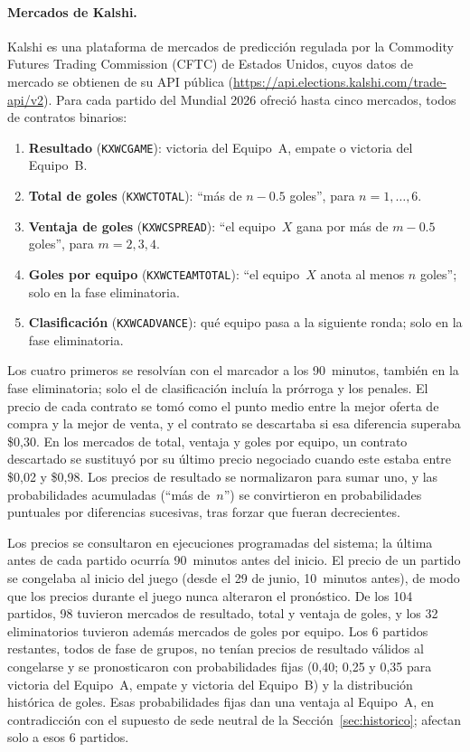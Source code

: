 \documentclass[12pt]{article}
\theoremstyle{plain}
\theoremstyle{remark}
\begin{document}
\paragraph{Mercados de Kalshi.}
Kalshi es una plataforma de mercados de predicción regulada por la
Commodity Futures Trading Commission (CFTC) de Estados Unidos, cuyos
datos de mercado se obtienen de su API pública
(\url{https://api.elections.kalshi.com/trade-api/v2}).
Para cada partido del Mundial 2026 ofreció hasta cinco mercados, todos
de contratos binarios:
\begin{enumerate}
  \item \textbf{Resultado} (\texttt{KXWCGAME}): victoria del
    Equipo~A, empate o victoria del Equipo~B.
  \item \textbf{Total de goles} (\texttt{KXWCTOTAL}): ``más de
    $n - 0.5$ goles'', para $n = 1, \ldots, 6$.
  \item \textbf{Ventaja de goles} (\texttt{KXWCSPREAD}): ``el
    equipo~$X$ gana por más de $m - 0.5$ goles'', para $m = 2, 3, 4$.
  \item \textbf{Goles por equipo} (\texttt{KXWCTEAMTOTAL}): ``el
    equipo~$X$ anota al menos $n$ goles''; solo en la fase
    eliminatoria.
  \item \textbf{Clasificación} (\texttt{KXWCADVANCE}): qué equipo
    pasa a la siguiente ronda; solo en la fase eliminatoria.
\end{enumerate}
Los cuatro primeros se resolvían con el marcador a los 90~minutos,
también en la fase eliminatoria; solo el de clasificación incluía la
prórroga y los penales.
El precio de cada contrato se tomó como el punto medio entre la mejor
oferta de compra y la mejor de venta, y el contrato se descartaba si
esa diferencia superaba \$0,30.
En los mercados de total, ventaja y goles por equipo, un contrato
descartado se sustituyó por su último precio negociado cuando este
estaba entre \$0,02 y \$0,98.
Los precios de resultado se normalizaron para sumar uno, y las
probabilidades acumuladas (``más de~$n$'') se convirtieron en
probabilidades puntuales por diferencias sucesivas, tras forzar que
fueran decrecientes.

Los precios se consultaron en ejecuciones programadas del sistema;
la última antes de cada partido ocurría 90~minutos antes del inicio.
El precio de un partido se congelaba al inicio del juego (desde el
29 de junio, 10~minutos antes), de modo que los precios durante el
juego nunca alteraron el pronóstico.
De los 104 partidos, 98 tuvieron mercados de resultado, total y
ventaja de goles, y los 32 eliminatorios tuvieron además mercados de
goles por equipo.
Los 6 partidos restantes, todos de fase de grupos, no tenían precios
de resultado válidos al congelarse y se pronosticaron con probabilidades
fijas (0,40; 0,25 y 0,35 para victoria del Equipo~A, empate y
victoria del Equipo~B) y la distribución histórica de goles.
Esas probabilidades fijas dan una ventaja al Equipo~A, en contradicción
con el supuesto de sede neutral de la Sección~\ref{sec:historico};
afectan solo a esos 6 partidos.
\end{document}
